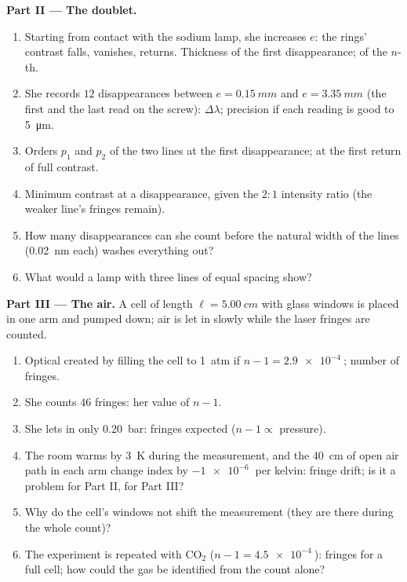 \begin{problem}
\medskip
\noindent\textbf{Part II --- The doublet.}
\begin{enumerate}[resume]
  \item Starting from contact with the sodium lamp, she increases $e$:
        the rings' contrast falls, vanishes, returns. Thickness of the
        first disappearance; of the $n$-th.
  \item She records $12$ disappearances between $e = \qty{0.15}{mm}$ and
        $e = \qty{3.35}{mm}$ (the first and the last read on the screw):
        $\Delta\lambda$; precision if each reading is good to \qty{5}{\micro m}.
  \item Orders $p_1$ and $p_2$ of the two lines at the first
        disappearance; at the first return of full contrast.
  \item Minimum contrast at a disappearance, given the $2 : 1$
        intensity ratio (the weaker line's fringes remain).
  \item How many disappearances can she count before the natural
        width of the lines (\qty{0.02}{nm} each) washes everything out?
  \item What would a lamp with three lines of equal spacing show?
\end{enumerate}

\medskip
\noindent\textbf{Part III --- The air.}
A cell of length $\ell = \qty{5.00}{cm}$ with glass windows is placed in one
arm and pumped down; air is let in slowly while the laser fringes are
counted.
\begin{enumerate}[resume]
  \item Optical  created by filling the cell to
        \qty{1}{atm} if $n - 1 = \qty{2.9e-4}{}$; number of fringes.
  \item She counts $46$ fringes: her value of $n - 1$.
  \item She lets in only \qty{0.20}{bar}: fringes expected ($n - 1 \propto$
        pressure).
  \item The room warms by \qty{3}{K} during the measurement, and the
        \qty{40}{cm} of open air path in each arm change index by
        $-\qty{1e-6}{}$ per kelvin: fringe drift; is it a problem for
        Part II, for Part III?
  \item Why do the cell's windows not shift the measurement (they are
        there during the whole count)?
  \item The experiment is repeated with CO$_2$ ($n - 1 = \qty{4.5e-4}{}$):
        fringes for a full cell; how could the gas be identified from
        the count alone?
\end{enumerate}


\end{problem}
